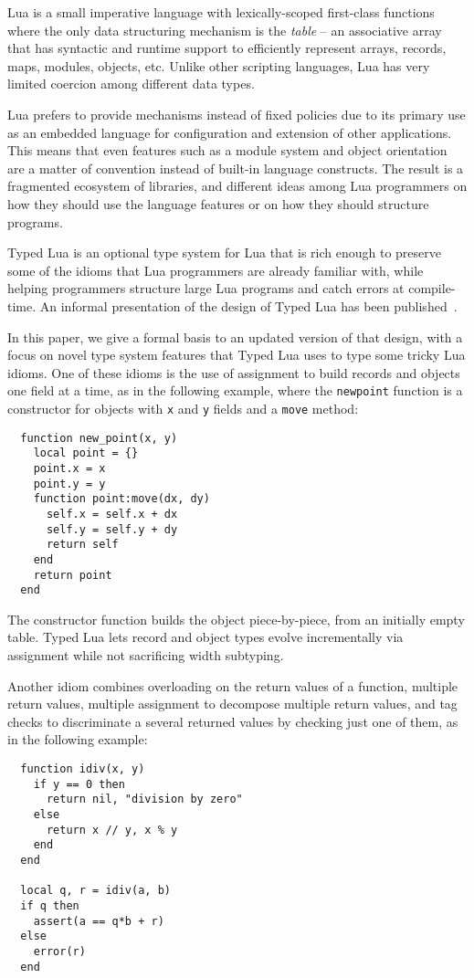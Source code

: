 \documentclass{sigplanconf}
\begin{document}
Lua is a small imperative language with lexically-scoped first-class functions where the only data structuring
mechanism is the \emph{table} --
an associative array that has syntactic and runtime support
to efficiently represent arrays, records, maps, modules,
objects, etc. Unlike other scripting languages, Lua has very limited coercion among different data types.

Lua prefers to provide mechanisms instead of fixed policies due
to its primary use as an embedded language for configuration and
extension of other applications.
This means that even features such as a module system and
object orientation are a matter of convention instead of
built-in language constructs.
The result is a fragmented ecosystem of libraries, and different
ideas among Lua programmers on how they should use the language
features or on how they should structure programs.

Typed Lua is an optional type system for
Lua that is rich enough to preserve some of the idioms
that Lua programmers are already familiar with, while
helping programmers structure large Lua programs and
catch errors at compile-time. An informal
presentation of the design of Typed Lua has been
published~\cite{maidl2014tl}.

In this paper, we give a formal basis to an updated version of that design, with a focus on novel type system features
that Typed Lua uses to type some tricky Lua idioms.
One of these idioms is the use of assignment to
build records and objects one field at a time, as in
the following example, where the {\tt newpoint} function
is a constructor for objects with {\tt x} and {\tt y}
fields and a {\tt move} method:
\begin{verbatim}
  function new_point(x, y)
    local point = {}
    point.x = x
    point.y = y
    function point:move(dx, dy)
      self.x = self.x + dx
      self.y = self.y + dy
      return self
    end
    return point
  end
\end{verbatim}

The constructor function builds the object piece-by-piece,
from an initially empty table. Typed Lua
lets record and object types evolve incrementally 
via assignment while not sacrificing width subtyping.

Another idiom combines overloading on the return values
of a function, multiple return values, multiple assignment
to decompose multiple return values,
and tag checks to discriminate a several returned values
by checking just one of them, as in the following example:
\begin{verbatim}
  function idiv(x, y)
    if y == 0 then
      return nil, "division by zero"
    else
      return x // y, x % y
    end 
  end
  
  local q, r = idiv(a, b)
  if q then
    assert(a == q*b + r)
  else
    error(r)
  end
\end{verbatim}
\end{document}
